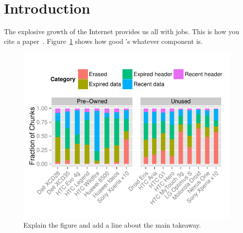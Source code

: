 \section{Introduction}
\label{sec:intro}

The explosive growth of the Internet provides us all with jobs. This is how you
cite a paper~\cite{Walls:2011a}. Figure~\ref{fig:bar} shows how good \sysname's
whatever component is.

\Blindtext[3]

\begin{figure}[t]
\centering
\includegraphics[width=\columnwidth]{../figures/bar_chunk/bar_chunk_fraction.pdf}
\caption{Explain the figure and add a line about the main takeaway.}
\label{fig:bar}
\end{figure} 


